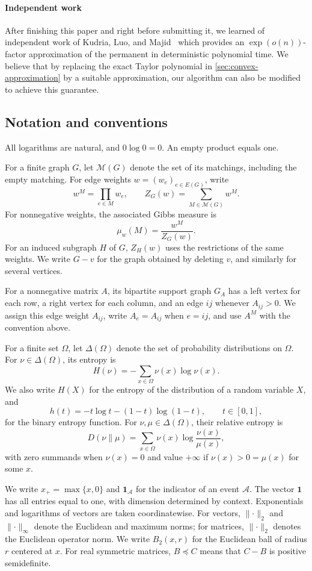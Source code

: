 \documentclass[11pt,reqno,letterpaper]{amsart}
\numberwithin{equation}{section}
\theoremstyle{definition}
\theoremstyle{remark}
\newcommand{\one}{\mathbf 1}
\newcommand{\cM}{\mathcal M}
\newcommand{\norm}[1]{\lVert #1\rVert}
\begin{document}
\medskip

\paragraph{\bf Independent work} After finishing this paper and right before submitting it, we learned of independent work of Kudria, Luo, and Majid~\cite{KLM} which provides an $\exp(o(n))$-factor approximation of the permanent in deterministic polynomial time. We believe that by replacing the exact Taylor polynomial in \cref{sec:convex-approximation} by a suitable approximation, our algorithm can also be modified to achieve this guarantee.  

\subsection{Notation and conventions}\label{sec:notation}

All logarithms are natural, and $0\log0=0$.
An empty product equals one.

For a finite graph $G$, let $\cM(G)$ denote the set of its
matchings, including the empty matching.
For edge weights $w=(w_e)_{e\in E(G)}$, write
\[
 w^M=\prod_{e\in M}w_e,\qquad
 Z_G(w)=\sum_{M\in\cM(G)}w^M.
\]
For nonnegative weights, the associated Gibbs measure is
\[
 \mu_w(M)=\frac{w^M}{Z_G(w)}.
\]
For an induced subgraph $H$ of $G$, $Z_H(w)$ uses the
restrictions of the same weights.
We write $G-v$ for the graph obtained by deleting $v$,
and similarly for several vertices.

For a nonnegative matrix $A$, its bipartite support graph $G_A$
has a left vertex for each row, a right vertex for each column,
and an edge $ij$ whenever $A_{ij}>0$.
We assign this edge weight $A_{ij}$, write $A_e=A_{ij}$ when
$e=ij$, and use $A^M$ with the convention above.

For a finite set $\Omega$, let $\Delta(\Omega)$ denote the set
of probability distributions on $\Omega$.
For $\nu\in\Delta(\Omega)$, its entropy is
\[
 H(\nu)=-\sum_{x\in\Omega}\nu(x)\log\nu(x).
\]
We also write $H(X)$ for the entropy of the distribution of
a random variable $X$, and
\[
 h(t)=-t\log t-(1-t)\log(1-t),\qquad t\in[0,1],
\]
for the binary entropy function.
For $\nu,\mu\in\Delta(\Omega)$, their relative entropy is
\[
 D(\nu\|\mu)=\sum_{x\in\Omega}\nu(x)\log\frac{\nu(x)}{\mu(x)},
\]
with zero summands when $\nu(x)=0$ and value $+\infty$
if $\nu(x)>0=\mu(x)$ for some $x$.

We write $x_+=\max\{x,0\}$ and $\one_{\mathcal A}$ for the
indicator of an event $\mathcal A$.
The vector $\one$ has all entries equal to one, with dimension
determined by context.
Exponentials and logarithms of vectors are taken coordinatewise.
For vectors, $\norm{\cdot}_2$ and $\norm{\cdot}_\infty$ denote
the Euclidean and maximum norms; for matrices,
$\norm{\cdot}_2$ denotes the Euclidean operator norm.
We write $B_2(x,r)$ for the Euclidean ball of radius $r$
centered at $x$.
For real symmetric matrices, $B\preceq C$ means that $C-B$
is positive semidefinite.
\end{document}
